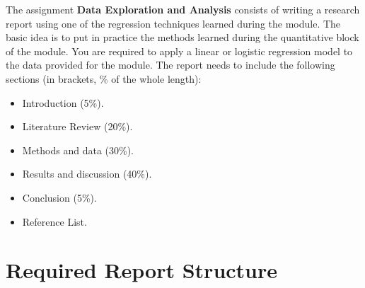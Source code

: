 \documentclass[
  letterpaper,
  DIV=11,
  numbers=noendperiod]{scrreprt}
\providecommand{\tightlist}{%
  \setlength{\itemsep}{0pt}\setlength{\parskip}{0pt}}
\begin{document}
The assignment \textbf{Data Exploration and Analysis} consists of
writing a research report using one of the regression techniques learned
during the module. The basic idea is to put in practice the methods
learned during the quantitative block of the module. You are required to
apply a linear or logistic regression model to the data provided for the
module. The report needs to include the following sections (in brackets,
\% of the whole length):

\begin{itemize}
\tightlist
\item
  Introduction (5\%).
\item
  Literature Review (20\%).
\item
  Methods and data (30\%).
\item
  Results and discussion (40\%).
\item
  Conclusion (5\%).
\item
  Reference List.
\end{itemize}

\section*{Required Report Structure}\label{required-report-structure}

\end{document}
